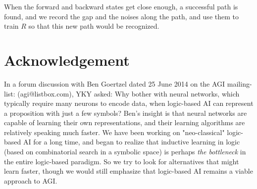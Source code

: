 \documentclass[orivec]{llncs}
\newcommand{\emp}[1]{\textbf{\textcolor{blue}{#1}}}
\begin{document}
When the forward and backward states get close enough, a successful path is found, and we record the gap and the noises along the path, and use them to train $R$ so that this new path would be recognized.




\fi

\section*{Acknowledgement}

\footnotesize{In a forum discussion with Ben Goertzel dated 25 June 2014 on the AGI mailing-list: (agi@listbox.com), YKY asked: Why bother with neural networks, which typically require many neurons to encode data, when logic-based AI can represent a proposition with just a few symbols?  Ben's insight is that neural networks are capable of learning their own representations, and their learning algorithms are relatively speaking much faster.  We have been working on "neo-classical" logic-based AI for a long time, and began to realize that inductive learning in logic (based on combinatorial search in a symbolic space) is perhaps \textit{the bottleneck} in the entire logic-based paradigm.  So we try to look for alternatives that might learn faster, though we would still emphasize that logic-based AI remains a viable approach to AGI. %
}


\end{document}

